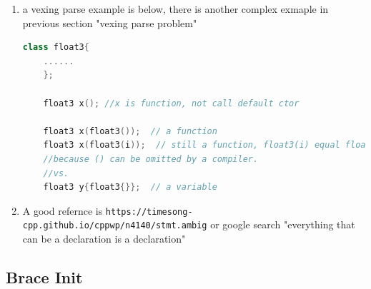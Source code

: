 \documentclass[a4paper,12pt,twoside]{book}
\begin{document}
\begin{enumerate}
	\item a vexing parse example is below, there is another complex exmaple in previous section "vexing parse problem"
	\begin{lstlisting}[frame=single, language=c++]
	class float3{
	......
	};
	
	float3 x(); //x is function, not call default ctor
	
	float3 x(float3());  // a function
	float3 x(float3(i));  // still a function, float3(i) equal float3 i;
	//because () can be omitted by a compiler. 
	//vs.
	float3 y{float3{}};  // a variable
	\end{lstlisting}
	
	\item A good refernce is \verb|https://timesong-cpp.github.io/cppwp/n4140/stmt.ambig| or google search 
	"everything that can be a declaration is a declaration" 
\end{enumerate}

\subsection{Brace Init}
\end{document}
